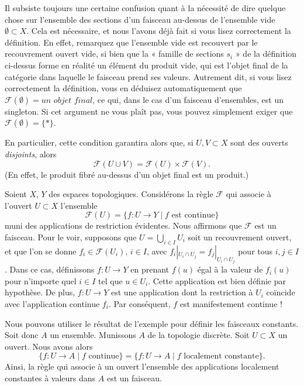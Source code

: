 \begin{remark}
\label{remark-confusion}
Il subsiste toujours une certaine confusion quant à la
nécessité de dire quelque chose sur l'ensemble des sections d'un
faisceau au-dessus de l'ensemble vide $\emptyset \subset X$.
Cela est nécessaire, et nous l'avons déjà fait si vous lisez
correctement la définition. En effet, remarquez que l'ensemble vide est
recouvert par le recouvrement ouvert vide, si bien que la « famille
de sections $s_i$ » de la définition ci-dessus forme en réalité
un élément du produit vide, qui est l'objet final
de la catégorie dans laquelle le faisceau prend ses valeurs. Autrement dit,
si vous lisez correctement la définition, vous en déduisez automatiquement
que $\mathcal{F}(\emptyset) = \textit{un objet final}$,
ce qui, dans le cas d'un faisceau d'ensembles, est un singleton.
Si cet argument ne vous plaît pas, vous pouvez simplement exiger
que $\mathcal{F}(\emptyset) = \{*\}$.

\medskip\noindent
En particulier, cette condition garantira alors que, si
$U, V \subset X$ sont des ouverts {\it disjoints}, alors
$$
\mathcal{F}(U \cup V) = \mathcal{F}(U) \times \mathcal{F}(V).
$$
(En effet, le produit fibré au-dessus d'un objet final est un produit.)
\end{remark}

\begin{example}
\label{example-basic-continuous-maps}
Soient $X$, $Y$ des espaces topologiques.
Considérons la règle $\mathcal{F}$ qui associe à
l'ouvert $U \subset X$ l'ensemble
$$
\mathcal{F}(U) = \{ f : U \to Y \mid f \text{ est continue}\}
$$
muni des applications de restriction évidentes. Nous affirmons que
$\mathcal{F}$ est un faisceau. Pour le voir, supposons que
$U = \bigcup_{i\in I} U_i$ soit un recouvrement ouvert, et que
l'on se donne $f_i \in \mathcal{F}(U_i)$, $i\in I$, avec
$f_i |_{U_i \cap U_j} = f_j|_{U_i \cap U_j}$ pour tous $i, j \in I$.
Dans ce cas, définissons $f : U \to Y$ en prenant $f(u)$
égal à la valeur de $f_i(u)$ pour n'importe quel $i \in I$ tel que
$u \in U_i$. Cette application est bien définie par hypothèse. De plus,
$f : U \to Y$ est une application dont la restriction à $U_i$
coïncide avec l'application continue $f_i$. Par conséquent, $f$ est
manifestement continue !
\end{example}

\noindent
Nous pouvons utiliser le résultat de l'exemple pour définir les
faisceaux constants. Soit donc $A$ un ensemble. Munissons $A$ de
la topologie discrète. Soit $U \subset X$ un ouvert.
Nous avons alors
$$
\{ f : U \to A \mid f\text{ continue}\}
=
\{ f : U \to A \mid f\text{ localement constante}\}.
$$
Ainsi, la règle qui associe à un ouvert l'ensemble des applications
localement constantes à valeurs dans $A$ est un faisceau.

